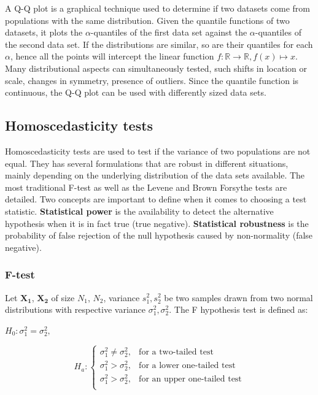 A Q-Q plot is a graphical technique used to determine if two datasets come from populations with the same distribution. Given the quantile functions of two datasets, it plots the $\alpha$-quantiles of the first data set against the $\alpha$-quantiles of the second data set. If the distributions are similar, so are their quantiles for each $\alpha$, hence all the points will intercept the linear function $f : \mathbb{R} \longrightarrow \mathbb{R}, f(x) \mapsto x$. Many distributional aspects can simultaneously tested, such shifts in location or scale, changes in symmetry, presence of outliers. Since the quantile function is continuous, the Q-Q plot can be used with differently sized data sets. 

\subsection{Homoscedasticity tests} \label{sec:homoscedasticity}
Homoscedasticity tests are used to test if the variance of two populations are not equal. They has several formulations that are robust in different situations, mainly depending on the underlying distribution of the data sets available. The most traditional F-test as well as the Levene and Brown Forsythe tests are detailed.
Two concepts are important to define when it comes to choosing a test statistic. \textbf{Statistical power} is the availability to detect the alternative hypothesis when it is in fact true (true negative). \textbf{Statistical robustness} is the probability of false rejection of the null hypothesis caused by non-normality (false negative).

\subsubsection{F-test}
Let $\mathbf{X_1}$, $\mathbf{X_2}$ of size $N_1$, $N_2$, variance $s_1^2, s_2^2$ be two samples drawn from two normal distributions with respective variance $\sigma_1^2, \sigma_2^2$. The F hypothesis test is defined as:
\begin{center}
    $H_0 : \sigma_1^2 = \sigma_2^2,$
\end{center}
\begin{equation}
    H_a : 
    \begin{cases}
        \sigma_1^2 \neq \sigma_2^2, & \text{for a two-tailed test}\\
        \sigma_1^2 > \sigma_2^2, & \text{for a lower one-tailed test}\\
        \sigma_1^2 > \sigma_2^2, & \text{for an upper one-tailed test}\\
    \end{cases}
\end{equation}

